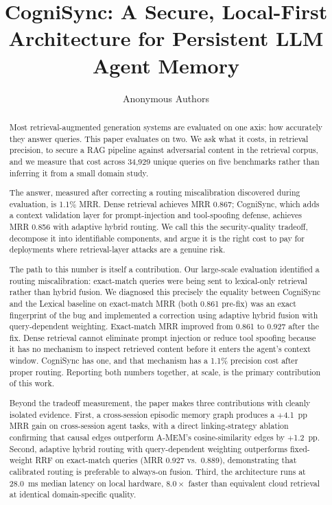 \documentclass[sigconf,authordraft]{acmart}
\begin{document}
\title{CogniSync: A Secure, Local-First Architecture for Persistent LLM
Agent Memory}

\author{Anonymous Authors}
\renewcommand{\shortauthors}{Anonymous et al.}

\begin{abstract}

Most retrieval-augmented generation systems are evaluated on one axis:
how accurately they answer queries. This paper evaluates on two. We ask
what it costs, in retrieval precision, to secure a RAG pipeline against
adversarial content in the retrieval corpus, and we measure that cost
across 34,929 unique queries on five benchmarks rather than inferring it from
a small domain study.

The answer, measured after correcting a routing miscalibration discovered
during evaluation, is 1.1\% MRR. Dense retrieval achieves MRR 0.867;
CogniSync, which adds a context validation layer for prompt-injection and
tool-spoofing defense, achieves MRR 0.856 with adaptive hybrid routing.
We call this the security-quality tradeoff, decompose it into identifiable
components, and argue it is the right cost to pay for deployments where
retrieval-layer attacks are a genuine risk.

The path to this number is itself a contribution. Our large-scale
evaluation identified a routing miscalibration: exact-match queries were
being sent to lexical-only retrieval rather than hybrid fusion. We
diagnosed this precisely the equality between CogniSync and the Lexical
baseline on exact-match MRR (both 0.861 pre-fix) was an exact fingerprint
of the bug and implemented a correction using adaptive hybrid fusion
with query-dependent weighting. Exact-match MRR improved from 0.861 to
0.927 after the fix. Dense retrieval cannot eliminate prompt injection or
reduce tool spoofing because it has no mechanism to inspect retrieved
content before it enters the agent's context window. CogniSync has one,
and that mechanism has a 1.1\% precision cost after proper routing.
Reporting both numbers together, at scale, is the primary contribution
of this work.

Beyond the tradeoff measurement, the paper makes three contributions with
cleanly isolated evidence. First, a cross-session episodic memory graph
produces a $+$4.1~pp MRR gain on cross-session agent tasks, with a direct
linking-strategy ablation confirming that causal edges outperform
A-MEM's cosine-similarity edges by $+$1.2~pp. Second, adaptive hybrid
routing with query-dependent weighting outperforms fixed-weight RRF on
exact-match queries (MRR 0.927 vs.~0.889), demonstrating that calibrated
routing is preferable to always-on fusion. Third, the architecture runs
at 28.0~ms median latency on local hardware, $8.0\times$ faster than
equivalent cloud retrieval at identical domain-specific quality.

\end{abstract}
\end{document}
